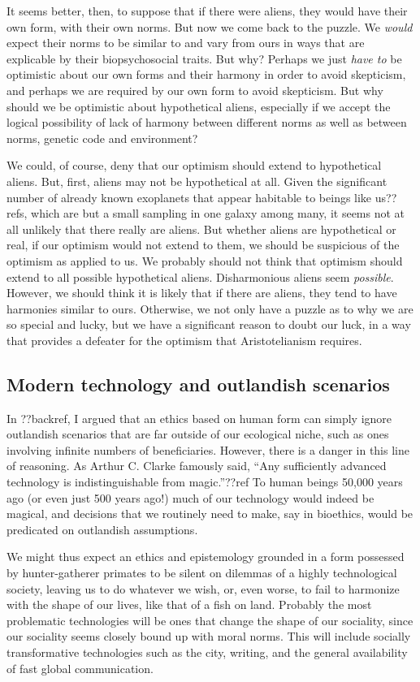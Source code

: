 It seems better, then, to suppose that if there were aliens, they would have their own form, with their own norms.
But now we come back to the puzzle. We \textit{would} expect their norms to be similar to and vary from ours in ways
that are explicable by their biopsychosocial traits. But why? Perhaps we just \textit{have to} be optimistic about 
our own forms and their harmony in order to avoid skepticism, and perhaps we are required by our own form to avoid 
skepticism. But why should we be optimistic about hypothetical aliens, especially if we accept the logical possibility
of lack of harmony between different norms as well as between norms, genetic code and environment? 

We could, of course, deny that our optimism should extend to hypothetical aliens. But, first, aliens may not be
hypothetical at all. Given the significant number of already known exoplanets that appear habitable to beings like 
us??refs, which are but a small sampling in one galaxy among many, it seems not at all unlikely that there really
are aliens. But whether aliens are hypothetical or real, if our optimism would not extend to them, we should be
suspicious of the optimism as applied to us. We probably should not think that optimism should extend to all possible hypothetical aliens. Disharmonious
aliens seem \textit{possible}. However, we should think it is likely that if there are aliens, they tend to have 
harmonies similar to ours. Otherwise, we not only have a puzzle as to why we are so special and lucky, but we have
a significant reason to doubt our luck, in a way that provides a defeater for the optimism that Aristotelianism
requires.


\subsection{Modern technology and outlandish scenarios}
In ??backref, I argued that an ethics based on human form can simply ignore outlandish scenarios
that are far outside of our ecological niche, such as ones involving infinite numbers of
beneficiaries. However, there is a danger in this line of reasoning. As Arthur C. Clarke famously
said, ``Any sufficiently advanced technology is indistinguishable from magic.''??ref To human beings
50,000 years ago (or even just 500 years ago!) much of our technology would indeed be magical, and 
decisions that we routinely need to make, say in bioethics, would be predicated on outlandish assumptions. 

We might thus expect an ethics and epistemology grounded in a form possessed by hunter-gatherer primates
to be silent on dilemmas of a highly technological society, leaving us to do whatever we wish, or, even worse, 
to fail to harmonize with the shape of our lives, like that of a fish on land. Probably the most problematic
technologies will be ones that change the shape of our sociality, since our sociality seems closely bound
up with moral norms. This will include socially transformative technologies such as the city, writing, and 
the general availability of fast global communication.

